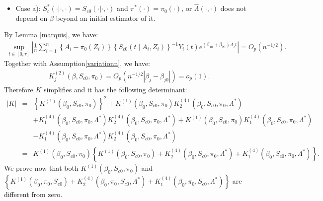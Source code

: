 \documentclass[11pt]{article}
\newcommand{\eqnn}{\begin{eqnarray*}}
\newcommand{\een}{\end{eqnarray*}}
\begin{document}

\begin{itemize}
\item{Case a): $S^{*}_c(\cdot | \cdot,\cdot)=S_{c0}(\cdot | \cdot,\cdot)$ and $\pi^{*}(\cdot)=\pi_0(\cdot)$, or $\hat \Lambda(\cdot,\cdot)$ does not depend on $\beta$ beyond an initial estimator of it.
}
\end{itemize}
By Lemma \ref{marquis}, 
we have:
\eqnn
\sup_{t \in [0,\tau]} \left|\frac{1}{n}\sum_{i=1}^n \left\{A_i-\pi_0(Z_i)\right\}\left\{S_{c0}(t \mid A_i,Z_i)\right\}^{-1}Y_i(t)e^{(\beta_{10}+\beta_{20})A_i t}\right|=O_p\left(n^{-1/2}\right).
\een
Together with Assumption\ref{variationn}, we have:
\eqnn
K^{(2)}_j(\beta, S_{c0}, \pi_0)=O_p(n^{-1/2}|\beta_j-\beta_{j0}|)=o_p(1).
\een
Therefore ${K}$ simplifies and it has the following determinant:
\eqnn
|{K}|&=&\left\{K^{(1)}(\beta_0,S_{c0},\pi_0)\right\}^2+K^{(1)}(\beta_0,S_{c0},\pi_0)K^{(4)}_{2}(\beta_0,S_{c0},\pi_0, \Lambda^{*})\\
&&+K^{(4)}_{1}(\beta_0,S_{c0},\pi_0,\Lambda^{*})K^{(4)}_{2}(\beta_0,S_{c0},\pi_0,\Lambda^{*})
+K^{(1)}(\beta_0,S_{c0},\pi_0)K^{(4)}_{1}(\beta_0,S_{c0},\pi_0,\Lambda^{*})\\
&&-K^{(4)}_{1}(\beta_0,S_{c0},\pi_0,\Lambda^{*})K^{(4)}_{2}(\beta_0,S_{c0},\pi_0,\Lambda^{*})\\
&=&K^{(1)}(\beta_0,S_{c0},\pi_0)\left\{K^{(1)}(\beta_0,S_{c0},\pi_0)+K^{(4)}_{2}(\beta_0,S_{c0},\pi_0,\Lambda^{*})+K^{(4)}_{1}(\beta_0,S_{c0},\pi_0,\Lambda^{*})\right\}.
\een
We prove now that both $K^{(1)}(\beta_0,S_{c0},\pi_{0})$ and\\ $\left\{K^{(1)}(\beta_0,\pi_0,S_{c0})+K^{(4)}_{2}(\beta_0,\pi_0,S_{c0},\Lambda^{*})+K^{(4)}_{1}(\beta_0,\pi_0,S_{c0},\Lambda^{*})\right\}$ are different from zero.
\end{document}
